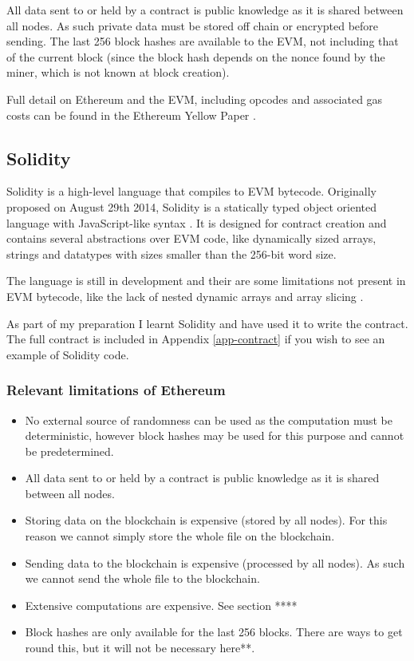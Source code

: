 \documentclass[10pt,twoside,a4paper]{article}
\begin{document}
All data sent to or held by a contract is public knowledge as it is shared between all nodes.
As such private data must be stored off chain or encrypted before sending.
The last 256 block hashes are available to the EVM, not including that of the current block (since the block hash depends on the nonce found by the miner, which is not known at block creation).

Full detail on Ethereum and the EVM, including opcodes and associated gas costs can be found in the Ethereum Yellow Paper \cite{eth-yellowpaper}.

\subsection{Solidity}

Solidity is a high-level language that compiles to EVM bytecode.
Originally proposed on August 29th 2014, Solidity is a statically typed object oriented language with JavaScript-like syntax \cite{solidity-proposal}.
It is designed for contract creation and contains several abstractions over EVM code, like dynamically sized arrays, strings and datatypes with sizes smaller than the 256-bit word size.

The language is still in development and their are some limitations not present in EVM bytecode, like the lack of nested dynamic arrays and array slicing \cite{solidity-docs}.

As part of my preparation I learnt Solidity and have used it to write the contract.
The full contract is included in Appendix \ref{app-contract} if you wish to see an example of Solidity code.

\subsubsection{Relevant limitations of Ethereum}

\begin{itemize}
\item No external source of randomness can be used as the computation must be deterministic,
however block hashes may be used for this purpose and cannot be predetermined.

\item All data sent to or held by a contract is public knowledge as it is shared between all nodes.

\item Storing data on the blockchain is expensive (stored by all nodes).
For this reason we cannot simply store the whole file on the blockchain.

\item Sending data to the blockchain is expensive (processed by all nodes).
As such we cannot send the whole file to the blockchain.

\item Extensive computations are expensive.
See section **** %

\item Block hashes are only available for the last 256 blocks.
There are ways to get round this, but it will not be necessary here**.
\end{itemize}
\end{document}
